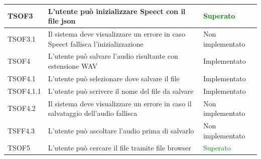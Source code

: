 \documentclass[openany,12pt,a4paper]{report}
\begin{document}
\begin{longtable}{| p{2cm} |p{8cm} | p{2.5cm} |}
	\newline TSOF3&		
	\newline L'utente può inizializzare Speect con il file json&
	\newline \textcolor{green}{Superato}
	\\[1em]	
	\hline	
	
	\newline TSOF3.1&
	\newline Il sistema deve visualizzare un errore in caso Speect fallisca l'inizializzazione&
	\newline Non implementato
	\\[1em]		
	\hline
	
	\newline TSOF4&
	\newline L'utente può salvare l'audio risultante con estensione WAV&
	\newline Implementato
	\\[1em]
	\hline
	
	\newline TSOF4.1&
	\newline L'utente può selezionare dove salvare il file&
	\newline Implementato
	\\[1em]
	
	\hline	
	\newline TSOF4.1.1&
	\newline L'utente può scrivere il nome del file da salvare&
	\newline Implementato
	\\[1em]
	
	\hline
	\newline TSOF4.2&
	\newline Il sistema deve visualizzare un errore in caso il salvataggio dell'audio fallisca&
	\newline Non implementato
	\\[1em]
	\hline
	
	\newline TSFF4.3&
	\newline L'utente può ascoltare l'audio prima di salvarlo&
	\newline Non implementato
	\\[1em]
	\hline
	
	\newline TSOF5&
	\newline L'utente può cercare il file tramite file browser&
	\newline \textcolor{green}{Superato}
	\\[1em]
	\hline
	

\end{longtable}
\end{document}
